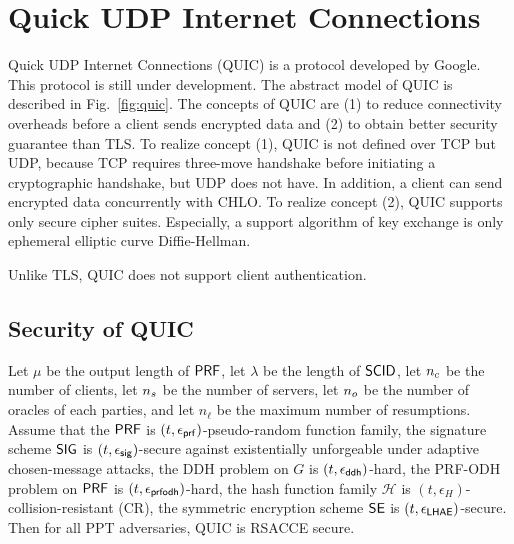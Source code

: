 \section{Quick UDP Internet Connections} \label{sec:quic}

% 
% 
% 

Quick UDP Internet Connections (QUIC) is a protocol developed by Google. This protocol is still under development. The abstract model of QUIC is described in Fig.~\ref{fig:quic}. The concepts of QUIC are (1) to reduce connectivity overheads before a client sends encrypted data and (2) to obtain better security guarantee than TLS.
To realize concept (1), QUIC is not defined over TCP but UDP, because TCP requires three-move handshake before initiating a cryptographic handshake, but UDP does not have. In addition, a client can send encrypted data concurrently with CHLO.
To realize concept (2), QUIC supports only secure cipher suites. Especially, a support algorithm of key exchange is only ephemeral elliptic curve Diffie-Hellman.

Unlike TLS, QUIC does not support client authentication.

\subsection{Security of QUIC} \label{sec:quic_detail}




\begin{theorem} \label{theorem:quic}
 Let $\mu$ be the output length of $\mathsf{PRF}$, let $\lambda$ be the length of $\mathsf{SCID}$, let $n_c$ be the number of clients, let $n_s$ be the number of servers, let $n_o$ be the number of oracles of each parties, and let $n_{\ell}$ be the maximum number of resumptions. Assume that the $\mathsf{PRF}$ is $(t, \epsilon_{\mathsf{prf}})$-pseudo-random function family, the signature scheme $\mathsf{SIG}$ is $(t, \epsilon_{\mathsf{sig}})$-secure against existentially unforgeable under adaptive chosen-message attacks, the DDH problem on $G$ is $(t, \epsilon_{\mathsf{ddh}})$-hard, the PRF-ODH problem on $\mathsf{PRF}$ is $(t, \epsilon_{\mathsf{prfodh}})$-hard, the hash function family $\mathcal{H}$ is $(t,\epsilon_{H})$-collision-resistant (CR), the symmetric encryption scheme $\mathsf{SE}$ is $(t, \epsilon_{\mathsf{LHAE}})$-secure.
 Then for all PPT adversaries, QUIC is RSACCE secure.
\end{theorem}%

